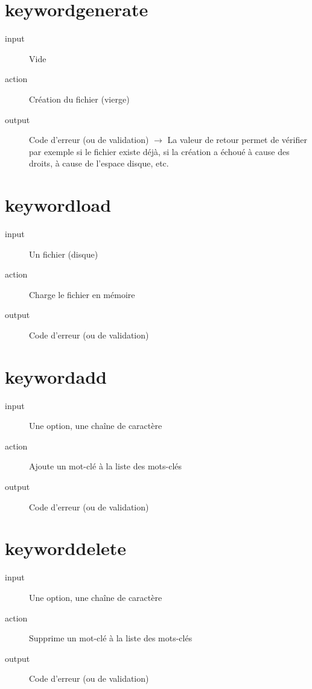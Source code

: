 \documentclass[16pts]{report}
\begin{document}
\section{keyword\textunderscore generate}
\label{sec:keyword generate}
\begin{description}
    \item[input] Vide
    \item[action] Création du fichier (vierge)
    \item[output] Code d’erreur (ou de validation) $\rightarrow$ La valeur de
        retour permet de vérifier par exemple si le fichier existe déjà, si la
        création a échoué à cause des droits, à cause de l’espace disque, etc.
\end{description}

\section{keyword\textunderscore load}
\label{sec:keyword load}
\begin{description}
    \item[input] Un fichier (disque)
    \item[action] Charge le fichier en mémoire
    \item[output] Code d'erreur (ou de validation)
\end{description}

\section{keyword\textunderscore add}
\label{sec:keyword add}
\begin{description}
    \item[input] Une option, une chaîne de caractère
    \item[action] Ajoute un mot-clé à la liste des mots-clés
    \item[output] Code d'erreur (ou de validation)
\end{description}

\section{keyword\textunderscore delete}
\label{sec:keyword delete}
\begin{description}
    \item[input] Une option, une chaîne de caractère
    \item[action] Supprime un mot-clé à la liste des mots-clés
    \item[output] Code d'erreur (ou de validation)
\end{description}
\end{document}
